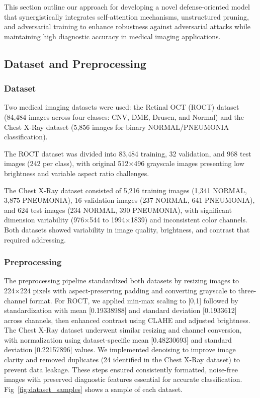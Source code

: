 \documentclass[preprint,12pt]{elsarticle}
\begin{document}
This section outline our approach for developing a novel defense-oriented model that synergistically integrates self-attention mechanisms, unstructured pruning, and adversarial training to enhance robustness against adversarial attacks while maintaining high diagnostic accuracy in medical imaging applications.

\subsection{Dataset and Preprocessing}

\subsubsection{Dataset}
Two medical imaging datasets were used: the Retinal OCT (ROCT) dataset (84,484 images across four classes: CNV, DME, Drusen, and Normal) and the Chest X-Ray dataset (5,856 images for binary NORMAL/PNEUMONIA classification). 

The ROCT dataset was divided into 83,484 training, 32 validation, and 968 test images (242 per class), with original 512×496 grayscale images presenting low brightness and variable aspect ratio challenges. 

The Chest X-Ray dataset consisted of 5,216 training images (1,341 NORMAL, 3,875 PNEUMONIA), 16 validation images (237 NORMAL, 641 PNEUMONIA), and 624 test images (234 NORMAL, 390 PNEUMONIA), with significant dimension variability (976×544 to 1994×1839) and inconsistent color channels. Both datasets showed variability in image quality, brightness, and contrast that required addressing.

\subsubsection{Preprocessing}
The preprocessing pipeline standardized both datasets by resizing images to 224×224 pixels with aspect-preserving padding and converting grayscale to three-channel format. For ROCT, we applied min-max scaling to [0,1] followed by standardization with mean [0.19338988] and standard deviation [0.1933612] across channels\cite{Elgendi21}, then enhanced contrast using CLAHE and adjusted brightness. The Chest X-Ray dataset underwent similar resizing and channel conversion, with normalization using dataset-specific mean [0.48230693] and standard deviation [0.22157896] values. We implemented denoising to improve image clarity and removed duplicates (24 identified in the Chest X-Ray dataset) to prevent data leakage\cite{Khalifa22}. These steps ensured consistently formatted, noise-free images with preserved diagnostic features essential for accurate classification\cite{Puttagunta21}. Fig~\ref{fig:dataset_samples} shows a sample of each dataset.
\end{document}
